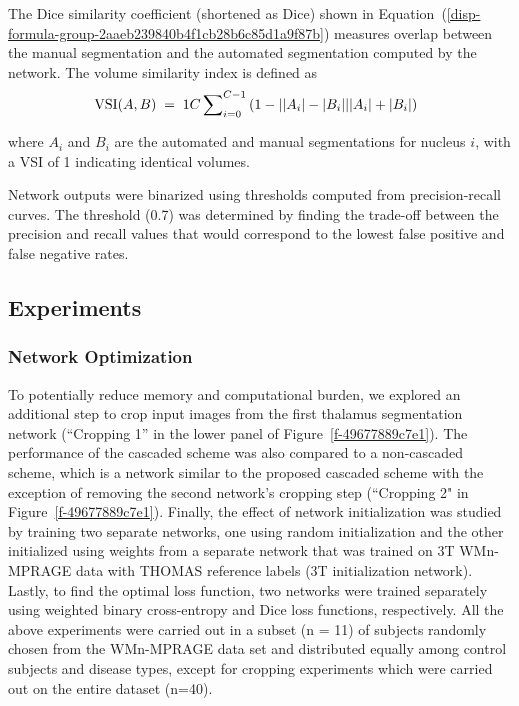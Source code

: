 \documentclass[3p,,final,12pt]{elsarticle}
\begin{document}
The Dice similarity coefficient (shortened as Dice) shown in Equation~(\ref{disp-formula-group-2aaeb239840b4f1cb28b6c85d1a9f87b})  measures overlap between the manual segmentation and the automated segmentation computed by the network. The volume similarity index is defined as 
\let\saveeqnno\theequation
\let\savefrac\frac
\def\dispfrac{\displaystyle\savefrac}
\begin{eqnarray}
\let\frac\dispfrac
\gdef\theequation{4}
\let\theHequation\theequation
\label{disp-formula-group-2a067b4f3fd04fa9843b3e7ae057d0e6}
\begin{array}{@{}l}\text{VSI}(A,B)\;=\;\frac1C\sum\nolimits_{i=0}^{C-1}\left(1-\frac{\left\vert \left\vert A_i\right\vert-\left\vert B_i\right\vert\right\vert}{\left\vert A_i\right\vert+\left\vert B_i\right\vert}\right)\end{array}
\end{eqnarray}
\global\let\theequation\saveeqnno
\addtocounter{equation}{-1}\ignorespaces 
where $A_i $ and $B_i $ are the automated and manual segmentations for nucleus $i $, with a VSI of 1 indicating identical volumes. 

Network outputs were binarized using thresholds computed from precision-recall curves. The threshold (0.7) was determined by finding the trade-off between the precision and recall values that would correspond to the lowest false positive and false negative rates. 



\subsection{Experiments}



\subsubsection{Network Optimization} To potentially reduce memory and computational burden, we explored an additional step to crop input images from the first thalamus segmentation network (``Cropping 1'' in the lower panel of Figure~\ref{f-49677889c7e1}). The performance of the cascaded scheme was also compared to a non-cascaded scheme, which is a network similar to the proposed cascaded scheme with the exception of removing the second network's cropping step (``Cropping 2" in Figure~\ref{f-49677889c7e1}). Finally, the effect of network initialization was studied by training two separate networks, one using random initialization and the other initialized using weights from a separate network that was trained on 3T WMn-MPRAGE data with THOMAS reference labels (3T initialization network). Lastly, to find the optimal loss function, two networks were trained separately using weighted binary cross-entropy and Dice loss functions, respectively. All the above experiments were carried out in a subset (n = 11) of subjects randomly chosen from the WMn-MPRAGE data set and distributed equally among control subjects and disease types, except for cropping experiments which were carried out on the entire dataset (n=40).
\end{document}
